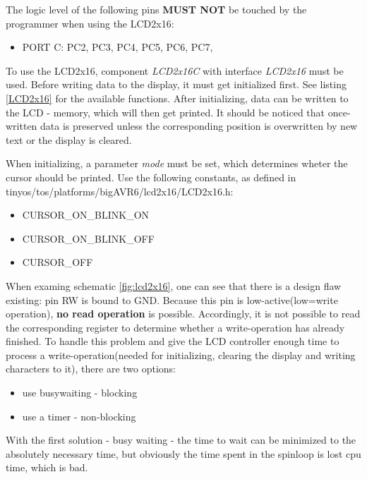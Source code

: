 The logic level of the following pins \textbf{MUST NOT} be touched by the programmer when using the LCD2x16:

\begin{itemize}
 \item PORT C: PC2, PC3, PC4, PC5, PC6, PC7, 
\end{itemize}

To use the LCD2x16, component \textit{LCD2x16C} with interface \textit{LCD2x16} must be used. Before writing data to the display, it must get initialized first. See listing \ref{LCD2x16} for the available functions. After initializing, data can be written to the LCD - memory, which will then get printed. It should be noticed that once-written data is preserved unless the corresponding position is overwritten by new text or the display is cleared. 

When initializing, a parameter \textit{mode} must be set, which determines wheter the cursor should be printed. Use the following constants, as defined in tinyos/tos/platforms/bigAVR6/lcd2x16/LCD2x16.h:

\begin{itemize}
 \item CURSOR\_ON\_BLINK\_ON
 \item CURSOR\_ON\_BLINK\_OFF
 \item CURSOR\_OFF
\end{itemize}



When examing schematic \ref{fig:lcd2x16}, one can see that there is a design flaw existing: pin RW is bound to GND. Because this pin is low-active(low=write operation), \textbf{no read operation} is possible. Accordingly, it is not possible to read the corresponding register to determine whether a write-operation has already finished. To handle this problem and give the LCD controller enough time to process a write-operation(needed for initializing, clearing the display and writing characters to it), there are two options:

\begin{itemize}
 \item use busywaiting - blocking
 \item use a timer - non-blocking
\end{itemize}

With the first solution - busy waiting - the time to wait can be minimized to the absolutely necessary time, but obviously the time spent in the spinloop is lost cpu time, which is bad.

